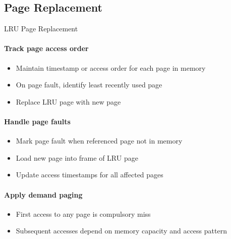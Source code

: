 \subsection{Page Replacement}

\begin{KR}{LRU Page Replacement}
    \paragraph{Track page access order}
    \begin{itemize}
        \item Maintain timestamp or access order for each page in memory
        \item On page fault, identify least recently used page
        \item Replace LRU page with new page
    \end{itemize}
    
    \paragraph{Handle page faults}
    \begin{itemize}
        \item Mark page fault when referenced page not in memory
        \item Load new page into frame of LRU page
        \item Update access timestamps for all affected pages
    \end{itemize}
    
    \paragraph{Apply demand paging}
    \begin{itemize}
        \item First access to any page is compulsory miss
        \item Subsequent accesses depend on memory capacity and access pattern
    \end{itemize}
\end{KR}

